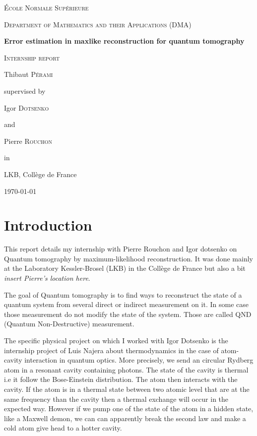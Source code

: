 \documentclass[10pt]{report}
\begin{document}
\begin{titlepage}
  \centering
  {\scshape\huge École Normale Supérieure \par}
  \vspace{0.3cm}
  {\scshape\Large Department of Mathematics and their Applications (DMA) \par}
  \vspace{3cm}
  {\Huge\bfseries Error estimation in maxlike reconstruction for quantum tomography \par}
  \vspace{0.5cm}
  {\scshape\Large Internship report\par}
  \vspace{3cm}
  {\LARGE Thibaut \textsc{Pérami}\par}
  \vfill
  {
    \large
    supervised by\par
    Igor \textsc{Dotsenko}\par
    and\par
    Pierre \textsc{Rouchon}\par
  in\par
  LKB, Collège de France
  }

  \vfill

  {\Large \today\par}
\end{titlepage}

\newcommand{\fset}{\ensuremath{\mathop{\text{\textquotesingle}}}}


\tableofcontents

\chapter*{Introduction}

This report details my internship with Pierre Rouchon and Igor dotsenko on
Quantum tomography by maximum-likelihood reconstruction. It was done mainly at
the Laboratory Kessler-Brosel (LKB) in the Collège de France but also a bit
\emph{insert Pierre's location here}.

The goal of Quantum tomography is to find ways to reconstruct the state of
a quantum system from several direct or indirect measurement on it. In some case
those measurement do not modify the state of the system. Those are called QND
(Quantum Non-Destructive) measurement.

The specific physical project on which I worked with Igor Dotsenko is the
internship project of Luis Najera about thermodynamics in the case of
atom-cavity interaction in quantum optics. More precisely, we send an circular
Rydberg atom in a resonant cavity containing photons. The state of the cavity is
thermal i.e it follow the Bose-Einstein distribution. The atom then interacts
with the cavity. If the atom is in a thermal state between two atomic level that
are at the same frequency than the cavity then a thermal exchange will occur in
the expected way. However if we pump one of the state of the atom in a hidden
state, like a Maxwell demon, we can can apparently break the second law and make
a cold atom give head to a hotter cavity.
\end{document}
